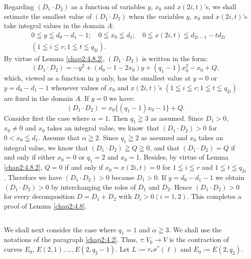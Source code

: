 \subsubsection{}\label{chap2:4.8.3}
\begin{proofoflemma*}[4.8 ]
  Regarding $(D_{1}\cdot D_{2})$ as a function of variables $y$, $x_{0}$
  and $x(2i,t)$'s, we shall estimate the smallest value of $(D_{1}\cdot
  D_{2})$ when the variables $y$, $x_{0}$ and $x(2i,t)$'s take integral
  values in the domain $A$:
  \begin{align*}
    & 0\leqq y\leqq d_{0}-d_{1}-1;\quad 0\leqq x_{0}\leqq d_{1};\quad
    0\leqq x(2i,t)\leqq d_{2i-1}-td_{2i}\\
    & (1\leqq i\leqq r; 1\leqq t\leqq q_{2i}).
  \end{align*}
  By virtue of Lemma \ref{chap2:4.8.2}, $(D_{1}\cdot D_{2})$ is written in
  the form:
  $$
  (D_{1}\cdot D_{2})=-y^{2}+(d_{0}-1-2x_{0})y+(q_{1}-1)x^{2}_{0}-x_{0}+Q,
  $$
  which, viewed as a function in $y$ only, has the smallest value at
  $y=0$ or $y=d_{0}-d_{1}-1$ whenever values of $x_{0}$ and $x(2i,t)$'s
  $(1\leqq i\leqq r; 1\leqq t\leqq q_{2i})$ are fixed in the domain
  $A$. If $y=0$ we have:
  $$
(D_{1}\cdot D_{2})=x_{0}\{(q_{1}-1)x_{0}-1\}+Q.
  $$
  Consider first the case where $\alpha=1$. Then $q_{1}\geqq 3$ as
  assumed. Since $D_{1}>0$, \iec $x_{0}\neq 0$ and $x_{0}$ takes an
  integral value, we know\pageoriginale\ that 
  $(D_{1}\cdot D_{2})>0$ for $0<x_{0}\leqq d_{1}$. Assume that
  $\alpha\geqq 2$. Since $q_{1}\geqq 2$ as assumed and $x_{0}$ takes an
  integral value, we know that $(D_{1}\cdot D_{2})\geqq Q\geqq 0$, and
  that $(D_{1}\cdot D_{2})=Q$ if and only if either $x_{0}=0$ or
  $q_{1}=2$ and $x_{0}=1$. Besides, by virtue of Lemma \ref{chap2:4.8.2},
  $Q=0$ if and only if $x_{0}=x(2i,t)=0$ for $1\leqq i\leqq r$ and
  $1\leqq t\leqq q_{2i}$. Therefore we have $(D_{1}\cdot D_{2})>0$
  because $D_{1}>0$. If $y=d_{0}-d_{1}-1$ we obtain $(D_{1}\cdot
  D_{2})>0$ by interchanging the roles of $D_{1}$ and $D_{2}$. Hence
  $(D_{1}\cdot D_{2})>0$ for every decomposition $D=D_{1}+D_{2}$ with
  $D_{i}>0(i=1,2)$. This completes a proof of Lemma \ref{chap2:4.8}.
\end{proofoflemma*}

\subsection{}\label{chap2:4.9}
We shall next consider the case where $q_{1}=1$ and $\alpha\geqq
3$. We shall use the notations of the paragraph \ref{chap2:4.2}. Thus,
$\tau:V_{0}\to V$ is the contraction of curves $E_{0}$,
$E(2,1),\ldots,E(2,q_{2}-1)$. Let $L:=\tau_{\ast}\sigma^{\ast}(\ell)$
and $\overline{E}_{0}:=\overline{E}(2,q_{2})$.


